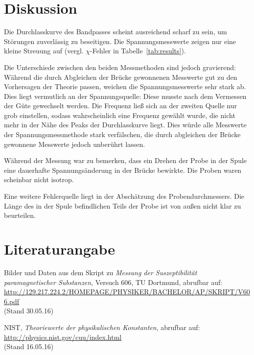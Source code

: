 \section{Diskussion}
\label{sec:Diskussion}

Die Durchlasskurve des Bandpasses scheint ausreichend scharf zu sein, um Störungen zuverlässig zu beseitigen. Die Spannungsmesswerte
zeigen nur eine kleine Streuung auf (vergl. $\chi$-Fehler in Tabelle~\ref{tab:results}).

Die Unterschiede zwischen den beiden Messmethoden sind jedoch gravierend: Während die durch Abgleichen der Brücke gewonnenen Messwerte gut zu den Vorhersagen der Theorie passen, weichen die Spannungsmesswerte sehr stark ab. Dies liegt vermutlich an der Spannungsquelle: Diese musste nach dem Vermessen der Güte gewechselt werden. Die Frequenz ließ sich an der zweiten Quelle nur grob einstellen, sodass wahrscheinlich eine Frequenz gewählt wurde, die nicht mehr in der Nähe des Peaks der Durchlasskurve liegt.
Dies würde alle Messwerte der Spannungsmessmethode stark verfälschen, die durch abgleichen der Brücke gewonnene Messwerte jedoch unberührt lassen.

Während der Messung war zu bemerken, dass ein Drehen der Probe in der Spule eine dauerhafte Spannungsänderung in der Brücke
bewirkte. Die Proben waren scheinbar nicht isotrop.

Eine weitere Fehlerquelle liegt in der Abschätzung des Probendurchmessers. Die Länge des in der Spule befindlichen Teils
der Probe ist von außen nicht klar zu beurteilen.

\newpage
\section{Literaturangabe}
\label{sec:Literatur}

Bilder und Daten aus dem Skript zu \emph{Messung der Suszeptibilität paramagnetischer Substanzen}, Versuch 606, TU Dortmund, abrufbar auf:\\
\url{http://129.217.224.2/HOMEPAGE/PHYSIKER/BACHELOR/AP/SKRIPT/V606.pdf}\\(Stand 30.05.16)\par


NIST, \emph{Theoriewerte der physikalischen Konstanten}, abrufbar auf:\\
\url{http://physics.nist.gov/cuu/index.html}\\
(Stand 16.05.16)\par

